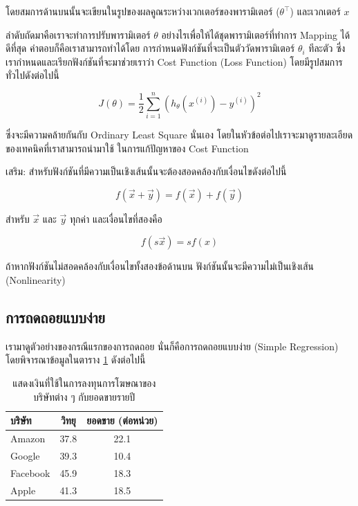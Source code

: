 \noindent โดยสมการด้านบนนั้นจะเขียนในรูปของผลคูณระหว่างเวกเตอร์ของพารามิเตอร์ ($\theta^{\top}$) และเวกเตอร์ $x$

ลำดับถัดมาคือเราจะทำการปรับพารามิเตอร์ $\theta$ อย่างไรเพื่อให้ได้ชุดพารามิเตอร์ที่ทำการ Mapping ได้ดีที่สุด คำตอบก็คือเราสามารถทำได้โดย%
การกำหนดฟังก์ชันที่จะเป็นตัววัดพารามิเตอร์ $\theta_{i}$ ทีละตัว ซึ่งเรากำหนดและเรียกฟังก์ชันที่จะมาช่วยเราว่า Cost Function (Loss Function)
โดยมีรูปสมการทั่วไปดังต่อไปนี้ 

\begin{equation}
    J(\theta) = \frac 1 2 \sum_{i=1}^n \left( h_\theta(x^{(i)}) - y^{(i)} \right)^2
\end{equation}

\noindent ซึ่งจะมีความคล้ายกันกับ Ordinary Least Square นั่นเอง โดยในหัวข้อต่อไปเราจะมาดูรายละเอียดของเทคนิคที่เราสามารถนำมาใช้%
ในการแก้ปัญหาของ Cost Function

\noindent เสริม: สำหรับฟังก์ชันที่มีความเป็นเชิงเส้นนั้นจะต้องสอดคล้องกับเงื่อนไขดังต่อไปนี้

\begin{equation}
    f(\vec{x} + \vec{y}) = f(\vec{x}) + f(\vec{y})
\end{equation}

\noindent สำหรับ $\vec{x}$ และ $\vec{y}$ ทุกค่า และเงื่อนไขที่สองคือ

\begin{equation}
    f(s\vec{x}) = sf(x)
\end{equation}

\noindent ถ้าหากฟังก์ชันไม่สอดคล้องกับเงื่อนไขทั้งสองข้อด้านบน ฟังก์ชันนั้นจะมีความไม่เป็นเชิงเส้น (Nonlinearity)

\subsection{การถดถอยแบบง่าย}
\label{sec:simple_lin_res}

เรามาดูตัวอย่างของกรณีแรกของการถดถอย นั่นก็คือการถดถอยแบบง่าย (Simple Regression) โดยพิจารณาข้อมูลในตาราง 
\ref{tab:simple_reg_data} ดังต่อไปนี้ 

\begin{table}[H]
    \centering
    \caption{แสดงเงินที่ใช้ในการลงทุนการโฆษณาของบริษัทต่าง ๆ กับยอดขายรายปี}
    \label{tab:simple_reg_data}
    \small
    \begin{tabular}{lcc}\toprule
    \textbf{บริษัท} &\textbf{วิทยุ} &\textbf{ยอดขาย (ต่อหน่วย)} \\\midrule
    Amazon &37.8 &22.1 \\
    Google &39.3 &10.4 \\
    Facebook &45.9 &18.3 \\
    Apple &41.3 &18.5 \\
    \bottomrule
    \end{tabular}
\end{table}

